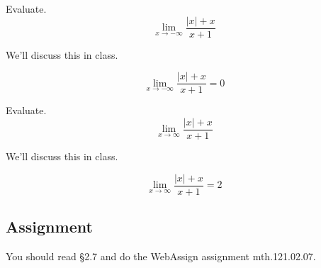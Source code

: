 \documentclass[12pt,addpoints, answers, fleqn]{exam}
\begin{document}
\begin{questions}
\question Evaluate.
\[
\lim_{x \to -\infty} \frac{\left| x \right| + x}{x+1}
\]

\begin{solution}
We'll discuss this in class.

\[
\lim_{x \to -\infty} \frac{\left| x \right| + x}{x+1} = 0
\]
\end{solution}

\question Evaluate.
\[
\lim_{x \to \infty} \frac{\left| x \right| + x}{x+1}
\]

\begin{solution}
We'll discuss this in class.

\[
\lim_{x \to \infty} \frac{\left| x \right| + x}{x+1}  = 2
\]
\end{solution}

\end{questions}











\subsection{Assignment}
You should read \S  2.7 and do the WebAssign assignment mth.121.02.07.
\vfill
\pagebreak
\end{document}
